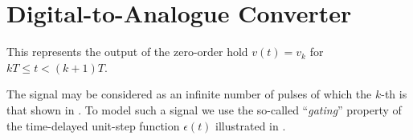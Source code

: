 \section*{Digital-to-Analogue Converter}

\ifslidesonly
\begin{slide}\label{dac}

\end{slide}
\fi


\ifslidesonly
\begin{slide}\label{dac}

\end{slide}
\fi


\begin{slide}\label{slide:l11s3}
  This represents the output of the zero-order hold $v(t) = v_k$ for
  $kT \le t < (k+1)T$.\\
  \begin{center}
  \end{center}
\end{slide}

The signal may be considered as an infinite number of pulses of which
  the $k$-th is that shown in . To model such a
  signal we use the so-called ``\emph{gating}'' property of the
  time-delayed unit-step function $\epsilon(t)$ illustrated in .

\ifslidesonly
\begin{slide}
\end{slide}
\fi
\begin{slide}\label{slide:l11s4}
  \begin{center}
  \end{center}
\end{slide}

